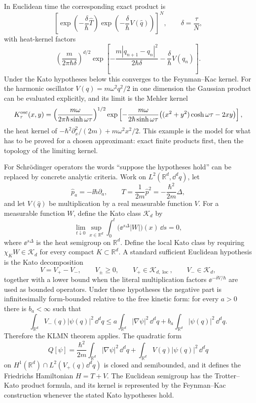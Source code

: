 In Euclidean time the corresponding exact product is
\[
  \left[
    \exp\left(-\frac{\delta}{\hbar}\widehat T\right)
    \exp\left(-\frac{\delta}{\hbar}V(\widehat q)\right)
  \right]^N,
  \qquad \delta=\frac{\tau}{N},
\]
with heat-kernel factors
\[
  \left(\frac{m}{2\pi\hbar\delta}\right)^{d/2}
  \exp\left[-\frac{m|q_{n+1}-q_n|^2}{2\hbar\delta}
            -\frac{\delta}{\hbar}V(q_n)\right].
\]
Under the Kato hypotheses below this converges to the Feynman--Kac kernel.
For the harmonic oscillator \(V(q)=m\omega^2q^2/2\) in one dimension the
Gaussian product can be evaluated explicitly, and its limit is the Mehler
kernel
\[
  K_\tau^{\rm osc}(x,y)
  =
  \left(\frac{m\omega}{2\pi\hbar\sinh\omega\tau}\right)^{1/2}
  \exp\left[
    -\frac{m\omega}{2\hbar\sinh\omega\tau}
    \bigl((x^2+y^2)\cosh\omega\tau-2xy\bigr)
  \right],
\]
the heat kernel of
\(-\hbar^2\partial_x^2/(2m)+m\omega^2x^2/2\).  This example is the model for
what has to be proved for a chosen approximant: exact finite products first,
then the topology of the limiting kernel.

\begin{definition}
\label{def:kato-schrodinger-euclidean-datum}
For Schr\"odinger operators the words ``suppose the hypotheses hold'' can be
replaced by concrete analytic criteria.  Work on
\(L^2(\mathbb R^d,\dd^dq)\), let
\[
  \widehat p_a=-\ii\hbar\partial_a,
  \qquad
  T=\frac{1}{2m}\widehat p^2=-\frac{\hbar^2}{2m}\Delta ,
\]
and let \(V(\widehat q)\) be multiplication by a real measurable function
\(V\).  For a measurable function \(W\), define the Kato class
\(\mathcal K_d\) by
\[
  \lim_{t\downarrow0}
  \sup_{x\in\mathbb R^d}
  \int_0^t
  \bigl(\ee^{s\Delta}|W|\bigr)(x)\,\dd s
  =
  0,
\]
where \(\ee^{s\Delta}\) is the heat semigroup on \(\mathbb R^d\).  Define the
local Kato class by requiring \(\chi_K W\in\mathcal K_d\) for every compact
\(K\subset\mathbb R^d\).  A standard sufficient Euclidean hypothesis is the
Kato decomposition
\[
  V=V_+-V_-,
  \qquad
  V_\pm\ge0,
  \qquad
  V_+\in\mathcal K_{d,\operatorname{loc}},
  \qquad
  V_-\in\mathcal K_d,
\]
together with a lower bound when the literal multiplication factors
\(\ee^{-\delta V/\hbar}\) are used as bounded operators.  Under these
hypotheses the negative part is infinitesimally form-bounded relative to the
free kinetic form: for every \(a>0\) there is \(b_a<\infty\) such that
\[
  \int_{\mathbb R^d} V_-(q)|\psi(q)|^2\,\dd^dq
  \le
  a\int_{\mathbb R^d}|\nabla\psi|^2\,\dd^dq
  +
  b_a\int_{\mathbb R^d}|\psi(q)|^2\,\dd^dq .
\]
Therefore the KLMN theorem applies.  The quadratic form
\[
  Q[\psi]
  =
  \frac{\hbar^2}{2m}\int_{\mathbb R^d}|\nabla\psi|^2\,\dd^dq
  +
  \int_{\mathbb R^d}V(q)|\psi(q)|^2\,\dd^dq
\]
on \(H^1(\mathbb R^d)\cap L^2(V_+(q)\dd^dq)\) is closed and semibounded, and it
defines the Friedrichs Hamiltonian \(H=T+V\).  The Euclidean semigroup has the
Trotter--Kato product formula, and its kernel is represented by the
Feynman--Kac construction whenever the stated Kato hypotheses hold.
\end{definition}

